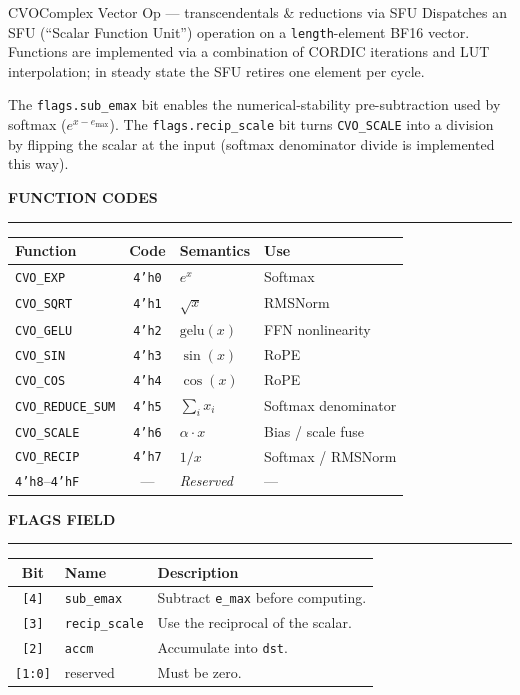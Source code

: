 \documentclass[11pt,a4paper,twoside,openany]{report}
\newcommand{\RefSection}[1]{%
  \par\medskip
  {\sffamily\bfseries\color{oceanblue}\normalsize\MakeUppercase{#1}}
  \par\vspace{-0.4em}
  {\color{oceanblue}\rule{\linewidth}{0.4pt}}\par\smallskip
}
\begin{document}
\begin{InstructionRef}{CVO}{Complex Vector Op --- transcendentals \& reductions via SFU}
Dispatches an SFU (``Scalar Function Unit'') operation on a
\texttt{length}-element BF16 vector. Functions are implemented via a
combination of CORDIC iterations and LUT interpolation; in steady
state the SFU retires one element per cycle.

The \texttt{flags.sub\_emax} bit enables the numerical-stability
pre-subtraction used by softmax ($e^{x - e_{\max}}$). The
\texttt{flags.recip\_scale} bit turns \texttt{CVO\_SCALE} into a
division by flipping the scalar at the input (softmax denominator
divide is implemented this way).

\RefSection{Function codes}

\begin{tabularx}{\linewidth}{|l|c|X|l|}
\hline
\rowcolor{skytint}
\textbf{Function} & \textbf{Code} & \textbf{Semantics} & \textbf{Use} \\
\hline
\texttt{CVO\_EXP}         & \texttt{4'h0} & $e^{x}$                  & Softmax \\
\hline
\texttt{CVO\_SQRT}        & \texttt{4'h1} & $\sqrt{x}$               & RMSNorm \\
\hline
\texttt{CVO\_GELU}        & \texttt{4'h2} & $\mathrm{gelu}(x)$       & FFN nonlinearity \\
\hline
\texttt{CVO\_SIN}         & \texttt{4'h3} & $\sin(x)$                & RoPE \\
\hline
\texttt{CVO\_COS}         & \texttt{4'h4} & $\cos(x)$                & RoPE \\
\hline
\texttt{CVO\_REDUCE\_SUM} & \texttt{4'h5} & $\sum_i x_i$             & Softmax denominator \\
\hline
\texttt{CVO\_SCALE}       & \texttt{4'h6} & $\alpha \cdot x$         & Bias / scale fuse \\
\hline
\texttt{CVO\_RECIP}       & \texttt{4'h7} & $1/x$                    & Softmax / RMSNorm \\
\hline
\texttt{4'h8}--\texttt{4'hF} & --- & \textit{Reserved} & --- \\
\hline
\end{tabularx}

\RefSection{Flags field}

\begin{tabularx}{\linewidth}{|c|l|X|}
\hline
\rowcolor{skytint}
\textbf{Bit} & \textbf{Name} & \textbf{Description} \\
\hline
\texttt{[4]}   & \texttt{sub\_emax}    & Subtract \texttt{e\_max} before computing. \\
\hline
\texttt{[3]}   & \texttt{recip\_scale} & Use the reciprocal of the scalar. \\
\hline
\texttt{[2]}   & \texttt{accm}         & Accumulate into \texttt{dst}. \\
\hline
\texttt{[1:0]} & reserved              & Must be zero. \\
\hline
\end{tabularx}


\end{InstructionRef}
\end{document}
